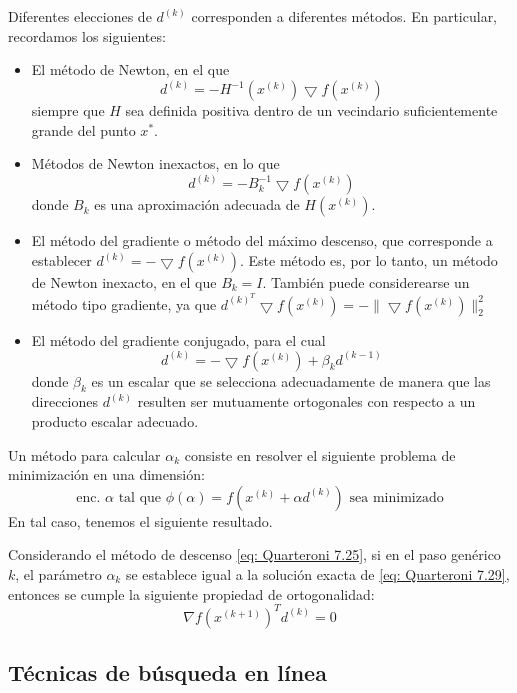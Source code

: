 Diferentes elecciones de $d^{(k)}$ corresponden a diferentes métodos. En particular, recordamos los siguientes:
\begin{itemize}
    \item El método de Newton, en el que
    \[ d^{(k)} = - H^{-1} (x^{(k)}) \bigtriangledown f(x^{(k)}) \]
    siempre que $H$ sea definida positiva dentro de un vecindario suficientemente grande del punto $x^*$.
    \item Métodos de Newton inexactos, en lo que
    \[ d^{(k)} = - B_k^{-1} \bigtriangledown f(x^{(k)}) \]
    donde $B_k$ es una aproximación adecuada de $H(x^{(k)})$.
    \item El método del gradiente o método del máximo descenso, que corresponde a establecer $ d^{(k)} = - \bigtriangledown f(x^{(k)}) $. Este método es, por lo tanto, un método de Newton inexacto, en el que $B_k = I$. También puede considerearse un método tipo gradiente, ya que $d^{(k)^T} \bigtriangledown f(x^{(k)}) = - \| \bigtriangledown f(x^{(k)}) \|^2_2$
    \item El método del gradiente conjugado, para el cual
    \[ d^{(k)} = - \bigtriangledown f(x^{(k)}) + \beta_k d^{(k-1)}\]
    donde $\beta_k$ es un escalar que se selecciona adecuadamente de manera que las direcciones $d^{(k)}$ resulten ser mutuamente ortogonales con respecto a un producto escalar adecuado.
\end{itemize}

Un método para calcular $\alpha_k$ consiste en resolver el siguiente problema de minimización en una dimensión:
\begin{equation}
    \label{eq: Quarteroni 7.29}
    \text{enc. } \alpha \text{ tal que } \phi(\alpha) = f(x^{(k)} + \alpha d^{(k)}) \text{ sea minimizado}
\end{equation}
En tal caso, tenemos el siguiente resultado.

\begin{theorem}
    Considerando el método de descenso \ref{eq: Quarteroni 7.25}, si en el paso genérico \( k \), el parámetro \( \alpha_k \) se establece igual a la solución exacta de \ref{eq: Quarteroni 7.29}, entonces se cumple la siguiente propiedad de ortogonalidad:
\[ \nabla f(x^{(k+1)})^T d^{(k)} = 0 \]
\end{theorem}

\subsection{Técnicas de búsqueda en línea}

